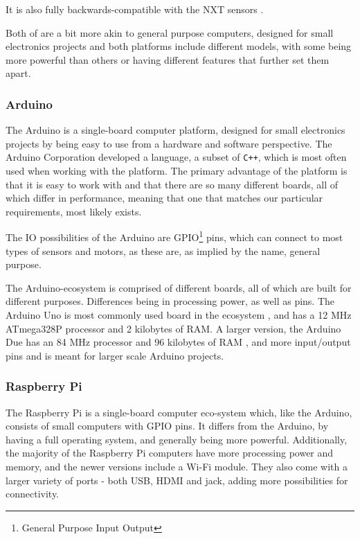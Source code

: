 It is also fully backwards-compatible with the NXT sensors \cite{ev3nxtcompatability}.




Both of are a bit more akin to general purpose computers, designed for small electronics projects and both platforms include different models, with some being more powerful than others or having different features that further set them apart.


\subsubsection{Arduino}
The Arduino is a single-board computer platform, designed for small electronics projects by being easy to use from a hardware and software perspective.
The Arduino Corporation developed a language, a subset of \texttt{C++}, which is most often used when working with the platform.
The primary advantage of the platform is that it is easy to work with and that there are so many different boards, all of which differ in performance, meaning that one that matches our particular requirements, most likely exists.

The IO possibilities of the Arduino are GPIO\footnote{General Purpose Input Output} pins, which can connect to most types of sensors and motors, as these are, as implied by the name, general purpose.

The Arduino-ecosystem is comprised of different boards, all of which are built for different purposes.
Differences being in processing power, as well as pins.
The Arduino Uno is most commonly used board in the ecosystem \cite{ArduinoUno3}, and has a 12 MHz ATmega328P processor and 2 kilobytes of RAM.
A larger version, the Arduino Due has an 84 MHz processor and 96 kilobytes of RAM \cite{ArduinoDue}, and more input/output pins and is meant for larger scale Arduino projects.

\subsubsection{Raspberry Pi}
The Raspberry Pi is a single-board computer eco-system which, like the Arduino, consists of small computers with GPIO pins.
It differs from the Arduino, by having a full operating system, and generally being more powerful.
Additionally, the majority of the Raspberry Pi computers have more processing power and memory, and the newer versions include a Wi-Fi module.
They also come with a larger variety of ports - both USB, HDMI and jack, adding more possibilities for connectivity.


